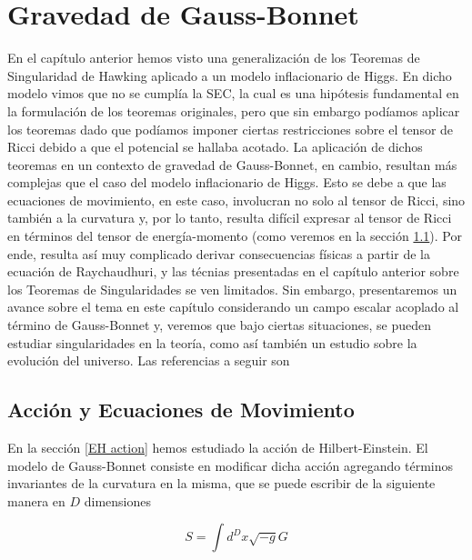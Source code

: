 ﻿\chapter{Gravedad de Gauss-Bonnet}\label{GB}

En el capítulo anterior hemos visto una generalización de los Teoremas de Singularidad de Hawking aplicado a un modelo inflacionario de Higgs. En dicho modelo vimos que no se cumplía la SEC, la cual es una hipótesis fundamental en la formulación de los teoremas originales, pero que sin embargo podíamos aplicar los teoremas dado que podíamos imponer ciertas restricciones sobre el tensor de Ricci debido a que el potencial se hallaba acotado. La aplicación de dichos teoremas en un contexto de gravedad de Gauss-Bonnet, en cambio, resultan más complejas que el caso del modelo inflacionario de Higgs. Esto se debe a que las ecuaciones de movimiento, en este caso, involucran no solo al tensor de Ricci, sino también a la curvatura y, por lo tanto, resulta difícil expresar al tensor de Ricci en términos del tensor de energía-momento (como veremos en la sección \ref{ec mov GB}). Por ende, resulta así muy complicado derivar consecuencias físicas a partir de la ecuación de Raychaudhuri, y las técnias presentadas en el capítulo anterior sobre los Teoremas de Singularidades se ven limitados. Sin embargo, presentaremos un avance sobre el tema en este capítulo considerando un campo escalar acoplado al término de Gauss-Bonnet y, veremos que bajo ciertas situaciones, se pueden estudiar singularidades en la teoría, como así también un estudio sobre la evolución del universo. Las referencias a seguir son \citep{2017arXiv170301713S,2015arXiv151200222H}







    
\section{Acción y Ecuaciones de Movimiento}\label{ec mov GB}


En la sección \ref{EH action} hemos estudiado la acción de Hilbert-Einstein. El modelo de Gauss-Bonnet consiste en modificar dicha acción agregando términos invariantes de la curvatura en la misma, que se puede escribir de la siguiente manera en $D$ dimensiones

\begin{equation}
    S=\int d^Dx \sqrt{-g}G
\end{equation}


